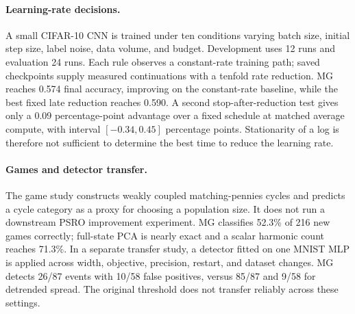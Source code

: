 {\paragraph{Learning-rate decisions.}
A small CIFAR-10 CNN is trained under ten conditions varying batch size, initial step size, label noise, data volume, and budget. Development uses 12 runs and evaluation 24 runs. Each rule observes a constant-rate training path; saved checkpoints supply measured continuations with a tenfold rate reduction. MG reaches 0.574 final accuracy, improving on the constant-rate baseline, while the best fixed late reduction reaches 0.590. A second stop-after-reduction test gives only a 0.09 percentage-point advantage over a fixed schedule at matched average compute, with interval $[-0.34,0.45]$ percentage points. Stationarity of a log is therefore not sufficient to determine the best time to reduce the learning rate.

\paragraph{Games and detector transfer.}
The game study constructs weakly coupled matching-pennies cycles and predicts a cycle category as a proxy for choosing a population size. It does not run a downstream PSRO improvement experiment. MG classifies 52.3\% of 216 new games correctly; full-state PCA is nearly exact and a scalar harmonic count reaches 71.3\%. In a separate transfer study, a detector fitted on one MNIST MLP is applied across width, objective, precision, restart, and dataset changes. MG detects 26/87 events with 10/58 false positives, versus 85/87 and 9/58 for detrended spread. The original threshold does not transfer reliably across these settings.

}
